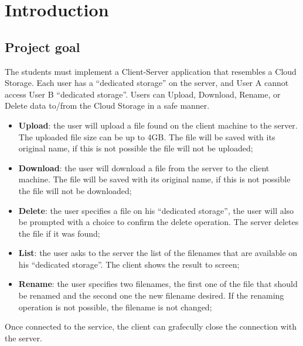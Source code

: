 
\chapter{Introduction}
\label{cap:introduction}

\section{Project goal}

The students must implement a Client-Server application that resembles a Cloud Storage. Each user has a  ``dedicated storage'' on the server, and User A cannot access User B ``dedicated storage''. Users can Upload, Download, Rename, or Delete data to/from the Cloud Storage in a safe manner.
\begin{itemize}
	\item \textbf{Upload}: the user will upload a file found on the client machine to the server. The uploaded file size can be up to 4GB. The file will be saved with its original name, if this is not possible the file will not be uploaded;
	\item \textbf{Download}: the user will download a file from the server to the client machine. The file will be saved with its original name, if this is not possible the file will not be downloaded; 
	\item \textbf{Delete}: the user specifies a file on his ``dedicated storage'', the user will also be prompted with a choice to confirm the delete operation. The server deletes the file if it was found; 
	\item \textbf{List}: the user asks to the server the list of the filenames that are available on his ``dedicated storage''. The client shows the result to screen;
	\item \textbf{Rename}: the user specifies two filenames, the first one of the file that should be renamed and the second one the new filename desired. If the renaming operation is not possible, the filename is not changed;
\end{itemize}

Once connected to the service, the client can grafecully close the connection with the server.

